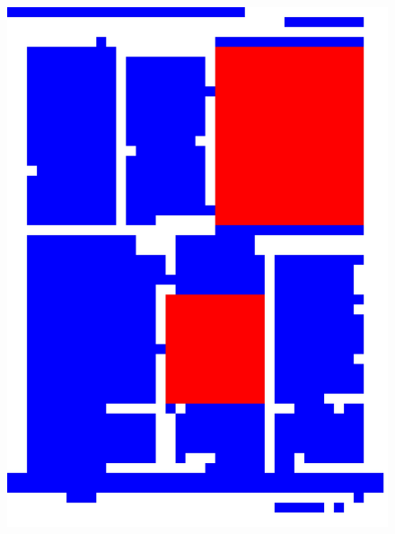 \documentclass{book}
\begin{document}
\begin{figure}[H]
\begin{center}
\includegraphics[scale=0.06]{images/4_res_hog_hsv_kmeans.jpg}

\end{center}
\end{figure}
\end{document}
